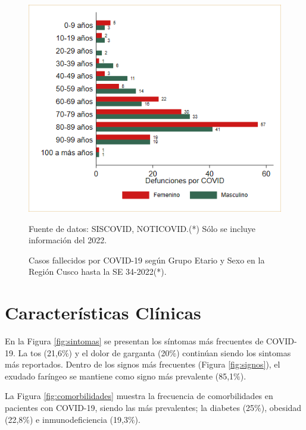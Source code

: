 \documentclass[12pt,a4paper,openany]{book}
\begin{document}
	\begin{figure}[h]
		\caption{Casos fallecidos por COVID-19 según Grupo Etario y Sexo en la Región Cusco hasta la SE 34-2022(*).}\label{fig:fallecidos_edad_sexo}
		\begin{center}
			\includegraphics[width=0.75\linewidth]{../figuras/defunciones_etapavida_2022}
		\end{center}
		{\footnotesize {Fuente de datos: SISCOVID, NOTICOVID.(*) Sólo se incluye información del 2022.}}
	\end{figure}
	
	
	
	\cleardoublepage
	
	
	\clearpage

	
	\section*{Características Clínicas}
	\noindent En la Figura \ref{fig:sintomas} se presentan los síntomas más frecuentes  de COVID-19. La tos (21,6$\%$) y el dolor de garganta (20$\%$) continúan siendo los sintomas más reportados. Dentro de los signos más frecuentes (Figura \ref{fig:signos}), el exudado faríngeo se mantiene como signo más prevalente (85,1$\%$). 
	
	\noindent La Figura \ref{fig:comorbilidades} muestra la frecuencia de comorbilidades en pacientes con COVID-19, siendo las más prevalentes; la diabetes (25$\%$), obesidad (22,8$\%$) e inmunodeficiencia (19,3$\%$).
	  
\end{document}
